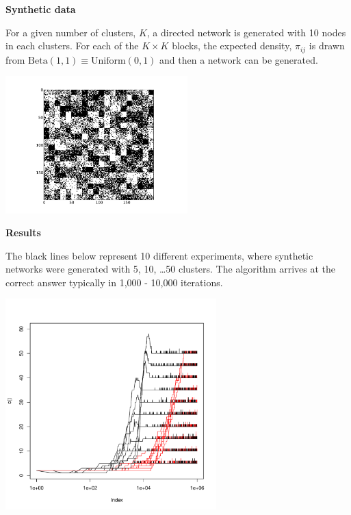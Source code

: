\documentclass[portrait,final,a0paper]{baposter}
\begin{document}
\begin{poster}
{  \textbf{Synthetic data}

  For a given number of clusters, $K$, a directed network is generated with 10 nodes in each clusters. For each of the $K \times K $ blocks, the expected density, $\pi_{ij}$ is drawn from $ \mbox{Beta}(1,1) \equiv \mbox{Uniform}(0,1) $ and then a network can be generated.

\includegraphics[width=19em]{K20adjacency}

  \textbf{Results}

  The black lines below represent 10 different experiments, where synthetic networks were generated with 5, 10, \ldots 50 clusters. The algorithm arrives at the correct answer typically in 1,000 - 10,000 iterations.

\includegraphics[width=22em]{LazSynthK}
  }
\end{poster}
\end{document}
